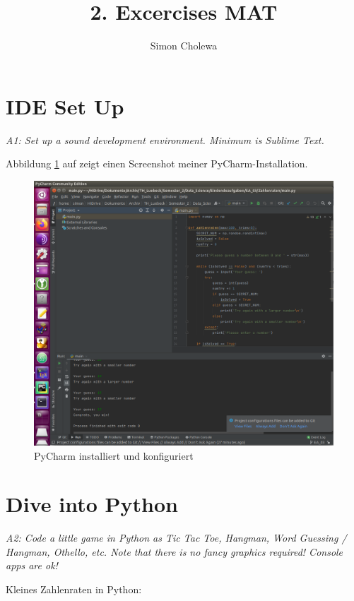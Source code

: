 \documentclass[11pt,a4paper]{article}
\author{Simon Cholewa}
\title{2. Excercises MAT}
\begin{document}
\maketitle

\section{IDE Set Up}
\textit{A1: Set up a sound development environment. Minimum is Sublime Text.}

Abbildung \ref{fig:pycharm} auf zeigt einen Screenshot meiner PyCharm-Installation.

\begin{figure}[!htbp] 
	\centering
	\includegraphics[width=1.0\linewidth]{images/PyCharm}
	\caption[PyCharm]{PyCharm installiert und konfiguriert}
	\label{fig:pycharm}
\end{figure}


\section{Dive into Python}
\textit{A2: Code a little game in Python as Tic Tac Toe, Hangman, Word Guessing / Hangman, Othello, etc. Note that there is no fancy graphics required! Console apps are ok!}

Kleines Zahlenraten in Python:


\end{document}
